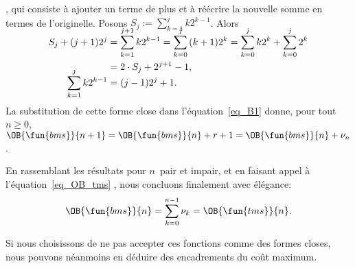 \begin{itemize}
\citep[\S~2.3]{GrahamKnuthPatashnik_1994}, qui consiste à ajouter
un terme de plus et à réécrire la nouvelle somme en termes de
l'originelle. Posons \(S_{j} := \sum_{k=1}^{j}{k2^{k-1}}\). Alors
\begin{align}
\abovedisplayskip=2pt
\belowdisplayskip=0pt
S_{j} + (j+1)2^j &= \smash[t]{\sum_{k=1}^{j+1}{k2^{k-1}}} = \smash[t]{\sum_{k=0}^{j}{(k+1)2^{k}}}
= \smash[t]{\sum_{k=0}^{j}{k2^{k}}} + \smash[t]{\sum_{k=0}^{j}{2^{k}}}\notag\\
&= 2 \cdot S_{j} + 2^{j+1} - 1,\notag\\
\smash[t]{\sum_{k=1}^{j}{k2^{k-1}}} &= (j-1)2^j + 1.\label{eq_Sj}
\end{align}
La substitution de cette forme close dans l'équation~\eqref{eq_B1}
donne, pour tout \(n \geqslant 0\), \(\OB{\fun{bms}}{n+1} =
\OB{\fun{bms}}{n} + r + 1 = \OB{\fun{bms}}{n} + \nu_n\).
\end{itemize}
En rassemblant les résultats pour \(n\)~pair et impair, et en faisant
appel à l'équation~\eqref{eq_OB_tms} , nous
concluons finalement avec élégance:
\begin{equation}
\OB{\fun{bms}}{n} = \sum_{k=0}^{n-1}{\nu_k} = \OB{\fun{tms}}{n}.
\label{eq_OBbms}\index{bms@$\OB{\fun{bms}}{n}$}
\end{equation}



Si nous choisissons de ne pas accepter ces fonctions comme des formes
closes, nous pouvons néanmoins en déduire des encadrements du coût
maximum.

